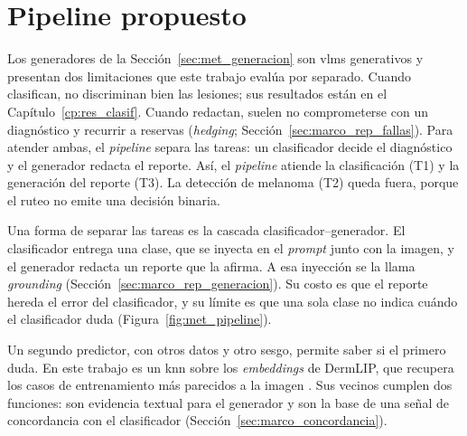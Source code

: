 \section{Pipeline propuesto}
\label{sec:met_pipeline}

Los generadores de la Sección~\ref{sec:met_generacion} son \glspl{vlm} generativos y presentan dos limitaciones que este
trabajo evalúa por separado. Cuando clasifican, no discriminan bien las lesiones; sus resultados están en el
Capítulo~\ref{cp:res_clasif}. Cuando redactan, suelen no comprometerse con un diagnóstico y recurrir a
reservas (\emph{hedging}; Sección~\ref{sec:marco_rep_fallas}). Para atender ambas, el \emph{pipeline} separa las tareas: un
clasificador decide el diagnóstico y el generador redacta el reporte. Así, el \emph{pipeline} atiende la clasificación (T1) y la
generación del reporte (T3). La detección de melanoma (T2) queda fuera, porque el ruteo no emite una decisión binaria.

Una forma de separar las tareas es la cascada clasificador--generador. El clasificador entrega una clase, que se
inyecta en el \emph{prompt} junto con la imagen, y el generador redacta un reporte que la afirma. A esa inyección se
la llama \emph{grounding} (Sección~\ref{sec:marco_rep_generacion}). Su costo es que el reporte hereda el error del
clasificador, y su límite es que una sola clase no indica cuándo el clasificador duda (Figura~\ref{fig:met_pipeline}).



Un segundo predictor, con otros datos y otro sesgo, permite saber si el primero duda. En este trabajo es un \gls{knn}
sobre los \emph{embeddings} de DermLIP, que recupera los casos de entrenamiento más parecidos a la imagen
\cite{cover1967nearest}. Sus vecinos cumplen dos funciones: son evidencia textual para el generador y son la base de
una señal de concordancia con el clasificador (Sección~\ref{sec:marco_concordancia}).

